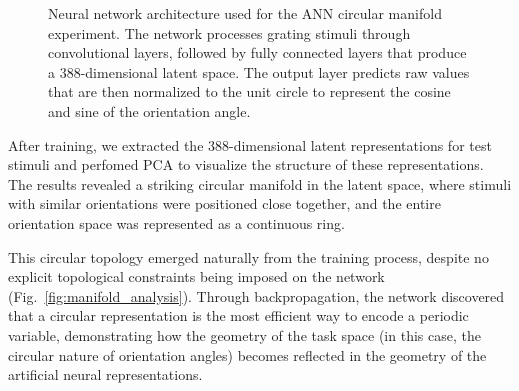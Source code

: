 \documentclass[11pt,a4paper]{article}
\begin{document}
\begin{figure}
\begin{tikzpicture}
    \end{tikzpicture}
    \caption{Neural network architecture used for the ANN circular manifold experiment. The network processes grating stimuli through convolutional layers, followed by fully connected layers that produce a 388-dimensional latent space. The output layer predicts raw values that are then normalized to the unit circle to represent the cosine and sine of the orientation angle.}
    \label{fig:nn}
\end{figure}

After training, we extracted the 388-dimensional latent representations for test stimuli and perfomed PCA to visualize the structure of these representations. The results revealed a striking circular manifold in the latent space, where stimuli with similar orientations were positioned close together, and the entire orientation space was represented as a continuous ring.

This circular topology emerged naturally from the training process, despite no explicit topological constraints being imposed on the network (Fig.~\ref{fig:manifold_analysis}). Through backpropagation, the network discovered that a circular representation is the most efficient way to encode a periodic variable, demonstrating how the geometry of the task space (in this case, the circular nature of orientation angles) becomes reflected in the geometry of the artificial neural representations.
\end{document}
